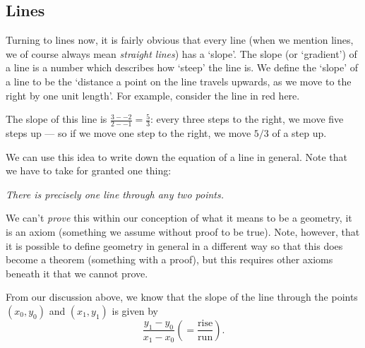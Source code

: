 \subsection*{Lines}
Turning to lines now, it is fairly obvious that every line (when we mention lines, we of course always mean \emph{straight lines}) has
a `slope'. The slope (or `gradient') of a line is a number which describes how `steep' the line is. We define the `slope' of a line to be the `distance
a point on the line travels upwards, as we move to the right by one unit length'. For example, consider the line in red here.
\begin{center}
\end{center}
The slope of this line is $ \frac{3 - -2}{2 - -1} = \frac{5}{3} $: every three steps to the right, we move five steps up --- so if we move
one step to the right, we move $ 5/3 $ of a step up.

We can use this idea to write down the equation of a line in general. Note that we have to take for granted one thing:
\begin{center}
  \emph{There is precisely one line through any two points.}
\end{center}
We can't \emph{prove} this within our conception of what it means to be a geometry, it is an axiom (something we assume without proof to be true).
Note, however, that it is possible to define geometry in general in a different way so that this does become a theorem (something with a proof), but
this requires other axioms beneath it that we cannot prove.

From our discussion above, we know that the slope of the line through the points $ (x_0, y_0) $ and $ (x_1, y_1) $ is given by
\begin{displaymath}
  \frac{y_1 - y_0}{x_1 - x_0} \left(= \frac{\text{rise}}{\text{run}}\right).
\end{displaymath}

